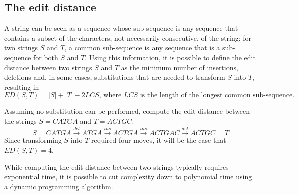 \documentclass{report}
\begin{document}
\subsection{The edit distance}
A string can be seen as a sequence whose sub-sequence is any sequence that contains a subset of the characters, not necessarily consecutive, of the string: for two strings $\displaystyle S$ and $\displaystyle T$, a common sub-sequence is any sequence that is a sub-sequence for both $\displaystyle S$ and $\displaystyle T$. \newline
Using this information, it is possible to define the edit distance between two strings $\displaystyle S$ and $\displaystyle T$ as the minimum number of insertions, deletions and, in some cases, substitutions that are needed to transform $\displaystyle S$ into $\displaystyle T$, resulting in
\[ED(S, T) = |S| + |T| -2LCS \text{, where $LCS$ is the length of the longest common sub-sequence.}\]
\begin{examplebox}
    Assuming no substitution can be performed, compute the edit distance between the strings $\displaystyle S = CATGA$ and $\displaystyle T = ACTGC$:
    \[S = CATGA \stackrel{del}{\to} ATGA \stackrel{ins}{\to} ACTGA \stackrel{ins}{\to} ACTGAC \stackrel{del}{\to} ACTGC = T\]
    Since transforming $\displaystyle S$ into $\displaystyle T$ required four moves, it will be the case that $\displaystyle ED(S, T) = 4$.
\end{examplebox}
\noindent While computing the edit distance between two strings typically requires exponential time, it is possible to cut complexity down to polynomial time using a dynamic programming algorithm.
\end{document}
